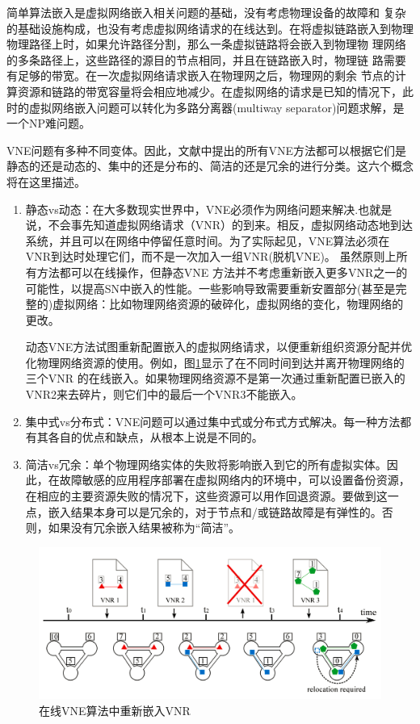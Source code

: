简单算法嵌入是虚拟网络嵌入相关问题的基础，没有考虑物理设备的故障和 复杂的基础设施构成，也没有考虑虚拟网络请求的在线达到。在将虚拟链路嵌入到物理物理路径上时，如果允许路径分割，那么一条虚拟链路将会嵌入到物理物 理网络的多条路径上，这些路径的源目的节点相同，并且在链路嵌入时，物理链 路需要有足够的带宽\cite{yu2008rethinking}。在一次虚拟网络请求嵌入在物理网之后，物理网的剩余 节点的计算资源和链路的带宽容量将会相应地减少。在虚拟网络的请求是已知的情况下，此时的虚拟网络嵌入问题可以转化为多路分离器(multiway separator)问题求解，是一个NP难问题\cite{andersen2002theoretical}。

VNE问题有多种不同变体。因此，文献中提出的所有VNE方法都可以根据它们是静态的还是动态的、集中的还是分布的、简洁的还是冗余的进行分类。这六个概念将在这里描述。
\begin{enumerate}
  \item 静态vs动态：在大多数现实世界中，VNE必须作为网络问题来解决.也就是说，不会事先知道虚拟网络请求（VNR）的到来。相反，虚拟网络动态地到达系统，并且可以在网络中停留任意时间。为了实际起见，VNE算法必须在VNR到达时处理它们，而不是一次加入一组VNR(脱机VNE)。 虽然原则上所有方法都可以在线操作，但静态VNE 方法并不考虑重新嵌入更多VNR之一的可能性，以提高SN中嵌入的性能。一些影响导致需要重新安置部分(甚至是完整的)虚拟网络：比如物理网络资源的破碎化，虚拟网络的变化，物理网络的更改。

      动态VNE方法试图重新配置嵌入的虚拟网络请求，以便重新组织资源分配并优化物理网络资源的使用。例如，图\ref{fig:RelocationMappedVNRsOnlineVNE}显示了在不同时间到达并离开物理网络的三个VNR 的在线嵌入。如果物理网络资源不是第一次通过重新配置已嵌入的VNR2来去碎片，则它们中的最后一个VNR3不能嵌入。


  \item 集中式vs分布式：VNE问题可以通过集中式或分布式方式解决。每一种方法都有其各自的优点和缺点，从根本上说是不同的。
  \item 简洁vs冗余：单个物理网络实体的失败将影响嵌入到它的所有虚拟实体。因此，在故障敏感的应用程序部署在虚拟网络内的环境中，可以设置备份资源，在相应的主要资源失败的情况下，这些资源可以用作回退资源。要做到这一点，嵌入结果本身可以是冗余的，对于节点和/或链路故障是有弹性的。否则，如果没有冗余嵌入结果被称为“简洁”。
\end{enumerate}

\begin{figure}[htbp]
\centering
\includegraphics[width=5.0in]{figures/RelocationMappedVNRsOnlineVNE}
  \caption{在线VNE算法中重新嵌入VNR}
  \label{fig:RelocationMappedVNRsOnlineVNE}
\end{figure}

